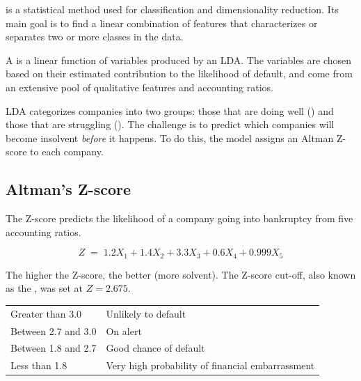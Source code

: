  is a statistical method used for
classification and dimensionality reduction. Its main goal is to find a linear
combination of features that characterizes or separates two or more classes in
the data.

A  is a linear function of variables produced by an LDA.
The variables are chosen based on their estimated contribution to the likelihood
of default, and come from an extensive pool of qualitative features and
accounting ratios.

LDA categorizes companies into two groups: those that are doing well
() and those that are struggling (). The challenge
is to predict which companies will become insolvent \emph{before} it happens. To
do this, the model assigns an Altman Z-score to each company.

\subsection*{Altman's Z-score}

The Z-score predicts the likelihood of a company going into bankruptcy from five
accounting ratios.

\begin{crfmlbox}
\[ Z \;=\; 1.2X_1 + 1.4X_2 + 3.3X_3 + 0.6X_4 + 0.999X_5 \]
\end{crfmlbox}

The higher the Z-score, the better (more solvent). The Z-score cut-off, also
known as the , was set at $Z = 2.675$.

\begin{center}
\footnotesize
\begin{tabular}{L{4.0cm} L{7.0cm}}
\toprule
{} &  \\
\midrule
Greater than 3.0 & Unlikely to default \\
Between 2.7 and 3.0 & On alert \\
Between 1.8 and 2.7 & Good chance of default \\
Less than 1.8 & Very high probability of financial embarrassment \\
\bottomrule
\end{tabular}
\end{center}

